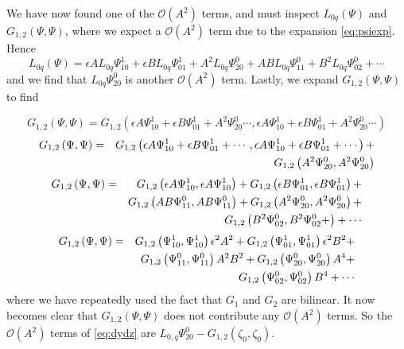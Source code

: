 We have now found one of the $\mathcal{O}(A^2)$ terms, and must inspect $ L_{0q}\left(\Psi\right)$ and $G_{1,2}\left( \Psi, \Psi\right)$,
where we expect a $\mathcal{O}(A^2)$ term due to the expansion \eqref{eq:psiexp}. Hence
\begin{equation}
L_{0q}\left(\Psi\right) = \epsilon A L_{0q} \Psi_{10}^1 + \epsilon B L_{0q} \Psi_{01}^1 + A^2 L_{0q}\Psi_{20}^0 + A B L_{0q} \Psi_{11}^0 + B^2 L_{0q}\Psi_{02}^0 + \cdots 
\end{equation}
and we find that $L_{0q}\Psi_{20}^0$ is another $\mathcal{O}(A^2)$ term. Lastly, we expand $G_{1,2}\left( \Psi, \Psi\right)$ to find

\begin{equation}
G_{1,2}\left(\Psi,\Psi\right) = 
G_{1,2}\left( \epsilon A \Psi_{10}^1 + \epsilon B \Psi_{01}^1 + A^2 \Psi_{20}^0 \cdots, \epsilon A \Psi_{10}^1 + \epsilon B \Psi_{01}^1 + A^2 \Psi_{20}^0 \cdots \right) 
\end{equation}
\begin{align}
G_{1,2}\left(\Psi,\Psi\right) &=& 
G_{1,2}\left( \epsilon A \Psi_{10}^1 + \epsilon B \Psi_{01}^1+\cdots ,\epsilon A \Psi_{10}^1 + \epsilon B \Psi_{01}^1 +\cdots\right) +\\
& &  G_{1,2}\left(A^2 \Psi_{20}^0, A^2 \Psi_{20}^0 \right) \notag
\end{align}
\begin{align}
G_{1,2}\left(\Psi,\Psi\right) &=& G_{1,2}\left(\epsilon A \Psi_{10}^1 ,\epsilon A \Psi_{10}^1\right) + G_{1,2}\left(\epsilon B \Psi_{01}^1, \epsilon B \Psi_{01}^1\right) + \\ 
& &  G_{1,2}\left(A B \Psi_{11}^0 , A B \Psi_{11}^0\right) + G_{1,2}\left(A^2 \Psi_{20}^0, A^2 \Psi_{20}^0 \right) + \notag \\
& &  G_{1,2}\left(B^2 \Psi_{02}^0 ,B^2 \Psi_{02}^0 + \right) + \cdots \notag
\end{align}
\begin{align}
G_{1,2}\left(\Psi,\Psi\right) &=& G_{1,2}\left(\Psi_{10}^1 ,\Psi_{10}^1\right) \epsilon^2 A^2 + 
G_{1,2}\left( \Psi_{01}^1, \Psi_{01}^1\right) \epsilon^2 B^2 + \\ 
& &  G_{1,2}\left(\Psi_{11}^0 , \Psi_{11}^0\right)A^2 B^2 + G_{1,2}\left(\Psi_{20}^0, \Psi_{20}^0 \right)A^4 + \notag \\
& &  G_{1,2}\left(\Psi_{02}^0 , \Psi_{02}^0 \right)B^4 + \cdots \notag
\end{align}
where we have repeatedly used the fact that $G_1$ and $G_2$ are bilinear. It now becomes clear that $ G_{1,2}\left(\Psi,\Psi\right) $ does not contribute
any $\mathcal{O}(A^2)$ terms.
So the $\mathcal{O}(A^2)$ terms of \eqref{eq:dydz} are  $ L_{0,q} \Psi_{20}^0 - G_{1,2}\left(\zeta_0,\zeta_0\right)$. 


